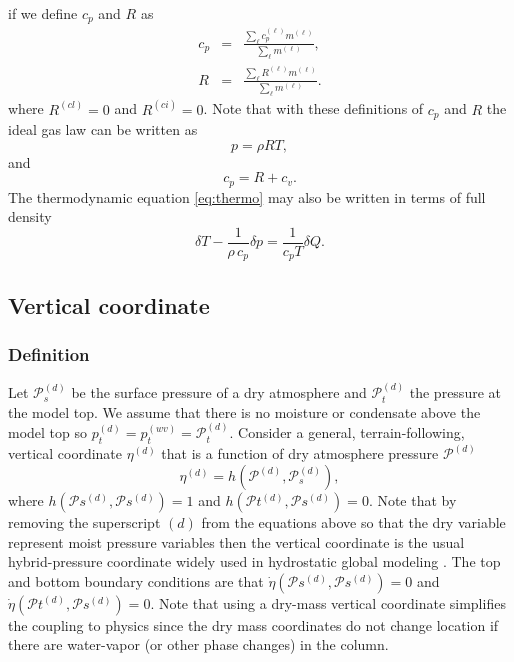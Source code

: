 \documentclass{agujournal}
\begin{document}
if we define $c_p$ and $R$ as
\begin{eqnarray}
c_p&=&\frac{\sum_\ell c_p^{(\ell)}m^{(\ell)}}{\sum_\ell m^{(\ell)}},\label{eq:cp} \\
R  &=&\frac{\sum_\ell R^{(\ell)} m^{(\ell)}}{\sum_\ell m^{(\ell)}}.
\end{eqnarray}
where $R^{(cl)}=0$ and $R^{(ci)}=0$. Note that with these definitions of $c_p$ and $R$ the ideal gas law can be written as
\begin{equation}
p=\rho R T,\label{eq:ig4}
\end{equation}
and 
\begin{equation}
c_p=R+c_v.
\end{equation}
The thermodynamic equation \eqref{eq:thermo} may also be written in terms of full density
\begin{equation}
\delta T-\frac{1}{\rho\, c_p}\delta p=\frac{1}{c_p T}\delta Q\label{eq:thermo2}.
\end{equation}
%
\subsection{Vertical coordinate}\label{eq:vertical_coord}
\subsubsection{Definition}
Let $\mathcal{P}^{(d)}_s$ be the surface pressure of a dry atmosphere  and $\mathcal{P}_t^{(d)}$ the pressure at the model top. We assume that there is no moisture or condensate above the model top so $p_t^{(d)}=p_t^{(wv)}=\mathcal{P}_t^{(d)}$. Consider a general, terrain-following, vertical coordinate $\eta^{(d)}$ that is a function of dry atmosphere pressure $\mathcal{P}^{(d)}$ 
\begin{equation}
\eta^{(d)}=h(\mathcal{P}^{(d)},\mathcal{P}_s^{(d)}),
\end{equation}
where $h(\mathcal{P}s^{(d)},\mathcal{P}s^{(d)})=1$ and $h(\mathcal{P}t^{(d)},\mathcal{P}s^{(d)})=0$. Note that by removing the superscript $(d)$ from the equations above so that the dry variable represent moist pressure variables then the vertical coordinate is the usual hybrid-pressure coordinate widely used in hydrostatic global modeling \citep{SB1981MWR}. The top and bottom boundary conditions are that $\dot{\eta}\left({\mathcal{P}s^{(d)},\mathcal{P}s^{(d)}}\right)=0$ and $\dot{\eta}\left( \mathcal{P}t^{(d)},\mathcal{P}s^{(d)}\right)=0$. Note that using a dry-mass vertical coordinate simplifies the coupling to physics since the dry mass coordinates do not change location if there are water-vapor (or other phase changes) in the column.
\end{document}
